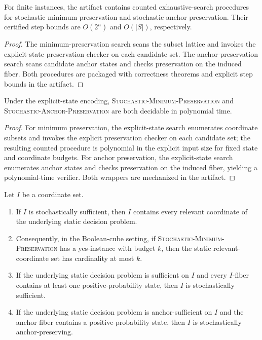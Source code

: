 \begin{proposition}\label{prop:stochastic-preservation-variant-search}
For finite instances, the artifact contains counted exhaustive-search procedures for stochastic minimum preservation and stochastic anchor preservation. Their certified step bounds are $O(2^n)$ and $O(|S|)$, respectively.
\end{proposition}

\begin{proof}
The minimum-preservation search scans the subset lattice and invokes the explicit-state preservation checker on each candidate set. The anchor-preservation search scans candidate anchor states and checks preservation on the induced fiber. Both procedures are packaged with correctness theorems and explicit step bounds in the artifact.
\end{proof}

\begin{theorem}\label{thm:stochastic-preservation-variants-explicit}
Under the explicit-state encoding, \textsc{Stochastic-Minimum-Preservation} and \textsc{Stochastic-Anchor-Preservation} are both decidable in polynomial time.
\end{theorem}

\begin{proof}
For minimum preservation, the explicit-state search enumerates coordinate subsets and invokes the explicit preservation checker on each candidate set; the resulting counted procedure is polynomial in the explicit input size for fixed state and coordinate budgets. For anchor preservation, the explicit-state search enumerates anchor states and checks preservation on the induced fiber, yielding a polynomial-time verifier. Both wrappers are mechanized in the artifact.
\end{proof}

\begin{proposition}\label{prop:stochastic-preservation-partial-general}
Let $I$ be a coordinate set.
\begin{enumerate}
\item If $I$ is stochastically sufficient, then $I$ contains every relevant coordinate of the underlying static decision problem.
\item Consequently, in the Boolean-cube setting, if \textsc{Stochastic-Minimum-Preservation} has a yes-instance with budget $k$, then the static relevant-coordinate set has cardinality at most $k$.
\item If the underlying static decision problem is sufficient on $I$ and every $I$-fiber contains at least one positive-probability state, then $I$ is stochastically sufficient.
\item If the underlying static decision problem is anchor-sufficient on $I$ and the anchor fiber contains a positive-probability state, then $I$ is stochastically anchor-preserving.
\end{enumerate}
\end{proposition}

